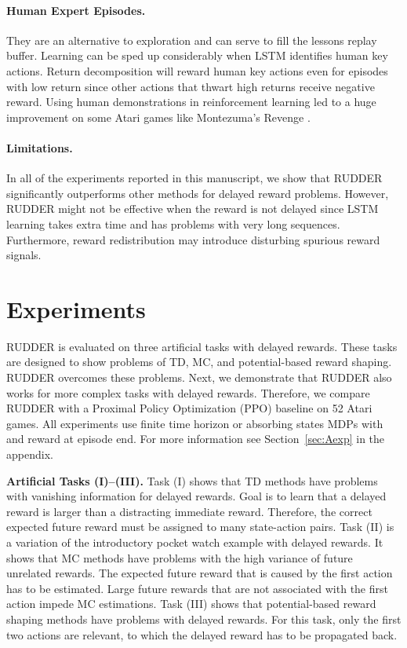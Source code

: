 \documentclass{article}
\begin{document}
\paragraph{Human Expert Episodes.} They are an alternative to 
exploration and can 
serve to fill the lessons replay buffer.
Learning can be sped up considerably when LSTM identifies
human key actions.
Return decomposition will reward human key actions even for episodes
with low return since other actions that thwart high
returns receive negative reward.
Using human demonstrations in reinforcement learning
led to a huge improvement on some Atari
games like Montezuma's Revenge \cite{Pohlen:18,Aytar:18}.


\paragraph{Limitations.}
In all of the experiments reported in this manuscript, we show that RUDDER significantly outperforms other methods for delayed reward problems. However, RUDDER might not be effective when the reward is not delayed since LSTM learning takes extra time and has problems with very long sequences. Furthermore, reward redistribution may introduce disturbing spurious reward signals.

\section{Experiments}
\label{sec:Mexperiments}
RUDDER is evaluated on three artificial tasks with delayed rewards.
These tasks are designed to show problems of TD, MC, 
and potential-based reward shaping.
RUDDER overcomes these problems.
Next, we demonstrate that RUDDER also works for more complex tasks
with delayed rewards.
Therefore, we compare RUDDER with 
a Proximal Policy Optimization (PPO) baseline
on 52 Atari games. 
All experiments use finite time horizon or 
absorbing states MDPs with  and reward at episode end.
For more information see Section~\ref{sec:Aexp} in the appendix.

{\bf Artificial Tasks (I)--(III).} 
Task (I) shows that TD methods have problems with vanishing information 
for delayed rewards.
Goal is to learn that a delayed reward is
larger than a distracting immediate reward.
Therefore, the correct expected future reward must be  
assigned to many state-action pairs. 
Task (II) is a variation of the introductory pocket watch example
with delayed rewards.
It shows that MC methods have problems with the 
high variance of future unrelated rewards.
The expected future reward that is caused by the first action
has to be estimated.
Large future rewards that are not associated 
with the first action impede MC estimations. 
Task (III) shows that potential-based reward shaping methods have
problems with delayed rewards.
For this task, only the first two actions are relevant, to which
the delayed reward has to be propagated back.
\end{document}
